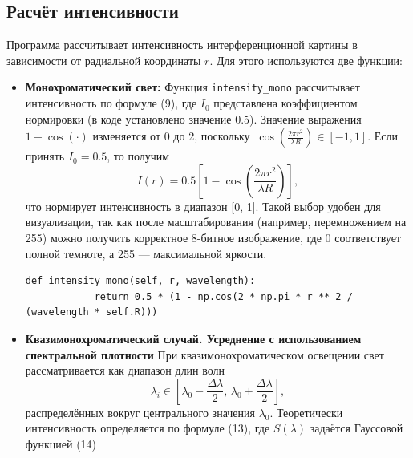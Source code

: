 \documentclass[a4paper,11pt]{article}
\theoremstyle{definition}
\begin{document}
    \subsection{Расчёт интенсивности}
    Программа рассчитывает интенсивность интерференционной картины в зависимости от радиальной координаты \( r \).
    Для этого используются две функции:
    \begin{itemize}
        \item \textbf{Монохроматический свет:} Функция \texttt{intensity\_mono} рассчитывает интенсивность
        по формуле (9), где \(I_0\) представлена коэффициентом нормировки (в коде установлено значение 0.5).
        Значение выражения \(1 - \cos(\cdot)\) изменяется от 0 до 2, поскольку
        \(\
            \cos\left(\frac{2\pi r^2}{\lambda R}\right) \in [-1, 1].
        \)
        Если принять \(I_0 = 0.5\), то получим
        \[
            I(r) = 0.5\left[1 - \cos\left(\frac{2\pi r^2}{\lambda R}\right)\right],
        \]
        что нормирует интенсивность в диапазон [0, 1]. Такой выбор удобен для визуализации, так как после масштабирования
        (например, перемножением на 255) можно получить корректное 8-битное изображение, где 0 соответствует полной
        темноте, а 255 --- максимальной яркости.

        \begin{lstlisting}[language=MyPython, label={lst:lstlisting}]
        def intensity_mono(self, r, wavelength):
            return 0.5 * (1 - np.cos(2 * np.pi * r ** 2 / (wavelength * self.R)))
        \end{lstlisting}

        \item{\textbf{Квазимонохроматический случай. Усреднение с использованием спектральной плотности}}
        При квазимонохроматическом освещении свет рассматривается как диапазон длин волн
        \[
        \lambda_i \in \left[\lambda_0 - \frac{\Delta\lambda}{2}, \, \lambda_0 + \frac{\Delta\lambda}{2}\right],
        \]
        распределённых вокруг центрального значения \(\lambda_0\). Теоретически интенсивность
        определяется по формуле (13), где \(S(\lambda)\) задаётся Гауссовой функцией (14)


\end{itemize}
\end{document}
